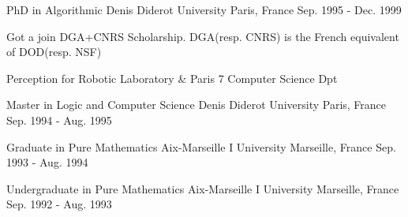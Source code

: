 

\begin{cventries}

  \cventry
    {PhD in Algorithmic} %
    {Denis Diderot University} %
    {Paris, France} %
    {Sep. 1995 - Dec. 1999} %
    {
      \begin{cvitems} %
        \item {Got a join DGA+CNRS Scholarship. DGA(resp. CNRS) is the French equivalent of DOD(resp. NSF)}
	\item {Perception for Robotic Laboratory \& Paris 7 Computer Science Dpt}
      \end{cvitems}
    }

  \cventry
    {Master in Logic and Computer Science} %
    {Denis Diderot University} %
    {Paris, France} %
    {Sep. 1994 - Aug. 1995} %
    {
    }

  \cventry
    {Graduate in Pure Mathematics} %
    {Aix-Marseille I University} %
    {Marseille, France} %
    {Sep. 1993 - Aug. 1994} %
    {
    }

  \cventry
    {Undergraduate in Pure Mathematics} %
    {Aix-Marseille I University} %
    {Marseille, France} %
    {Sep. 1992 - Aug. 1993} %
    {
    }

\end{cventries}

